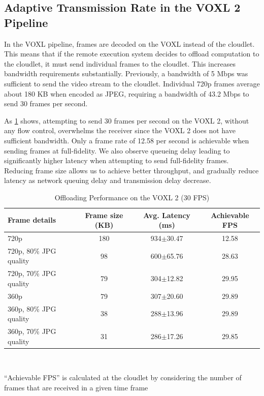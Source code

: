 \subsection{Adaptive Transmission Rate in the VOXL 2 Pipeline}

In the VOXL pipeline, frames are decoded on the VOXL instead of the cloudlet.
This means that if the remote execution system decides to offload computation
to the cloudlet, it must send individual frames to the cloudlet. This increases
bandwidth requirements substantially. Previously, a bandwidth of 5 Mbps was
sufficient to send the video stream to the cloudlet. Individual 720p frames
average about 180 KB when encoded as JPEG, requiring a bandwidth of 43.2 Mbps
to send 30 frames per second.

As \cref{tab:voxl2-offload-performance} shows, attempting to send 30 frames per
second on the VOXL 2, without any flow control, overwhelms the receiver since
the VOXL 2 does not have sufficient bandwidth.  Only a frame rate of 12.58 per
second is achievable when sending frames at full-fidelity. We also observe
queueing delay leading to significantly higher latency when attempting to send
full-fidelity frames.  Reducing frame size allows us to achieve better
throughput, and gradually reduce latency as network queuing delay and
transmission delay decrease.

\begin{table}[htbp]
    \centering
    \begin{tabular}{@{}lccc@{}}
        \toprule
        \textbf{Frame details} & \textbf{Frame size (KB)} & \textbf{Avg. Latency (ms)} & \textbf{Achievable FPS}\\
        \midrule
        720p & 180 & 934$\pm$\small{30.47} & 12.58\\
        720p, 80\% JPG quality  & 98 & 600$\pm$\small{65.76} &28.63\\
        720p, 70\% JPG quality & 79 & 304$\pm$\small{12.82} & 29.95\\
        360p & 79 & 307$\pm$\small{20.60}  &29.89 \\
        360p, 80\% JPG quality & 38 &288$\pm$\small{13.96} & 29.89\\
        360p, 70\% JPG quality & 31 & 286$\pm$\small{17.26} & 29.85\\
        \bottomrule
\end{tabular}\\
\begin{captext}
``Achievable FPS'' is calculated at the cloudlet
by considering the number of frames that are received in a given time frame
\end{captext}
\caption{Offloading Performance on the VOXL 2 (30 FPS)}
\label{tab:voxl2-offload-performance}
\end{table}

